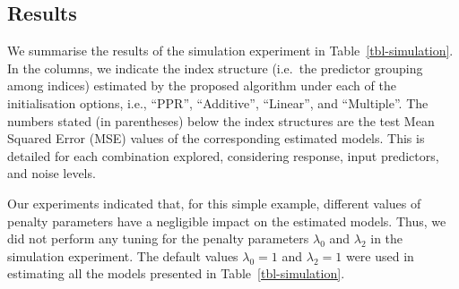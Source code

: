 \documentclass[
  11pt,
  a4paper,
]{article}
\begin{document}
\subsection{Results}\label{sec-sim-results}

We summarise the results of the simulation experiment in
Table~\ref{tbl-simulation}. In the columns, we indicate the index
structure (i.e.~the predictor grouping among indices) estimated by the
proposed algorithm under each of the initialisation options, i.e.,
``PPR'', ``Additive'', ``Linear'', and ``Multiple''. The numbers stated
(in parentheses) below the index structures are the test Mean Squared
Error (MSE) values of the corresponding estimated models. This is
detailed for each combination explored, considering response, input
predictors, and noise levels.

Our experiments indicated that, for this simple example, different
values of penalty parameters have a negligible impact on the estimated
models. Thus, we did not perform any tuning for the penalty parameters
\(\lambda_{0}\) and \(\lambda_{2}\) in the simulation experiment. The
default values \(\lambda_{0} = 1\) and \(\lambda_{2} = 1\) were used in
estimating all the models presented in Table~\ref{tbl-simulation}.
\end{document}
